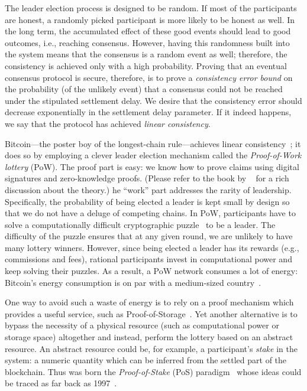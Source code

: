 The leader election process is designed to be random. 
If most of the participants are honest, 
a randomly picked participant is more likely to be honest as well. 
In the long term, the accumulated effect of these good events 
should lead to good outcomes, i.e., reaching consensus. 
However, having this randomness built into the system means 
that the consensus is a random event as well; 
therefore, the consistency is achieved only with a high probability. 
Proving that an eventual consensus protocol is secure, 
therefore, is to prove a 
\emph{consistency error bound} 
on the probability (of the unlikely event) that a consensus could not be reached 
under the stipulated settlement delay. 
We desire that the consistency error should decrease exponentially 
in the settlement delay parameter. 
If it indeed happens, 
we say that the protocol has achieved \emph{linear consistency}.

Bitcoin---the poster boy of the longest-chain rule---achieves 
linear consistency~\cite{Nakamoto2008,GKL,PSS}; it does so by employing a clever leader election mechanism 
called the \emph{Proof-of-Work lottery} (PoW). 
The proof part is easy: we know how to prove claims using 
digital signatures and zero-knowledge proofs. (Please 
refer to the book by ~\citet{GoldreichFoC} 
for a rich discussion about the theory.) 
he ``work'' part addresses the rarity of leadership. 
Specifically, 
the probability of being elected a leader is kept small by design 
so that we do not have a deluge of competing chains. 
In PoW, participants have to solve a computationally difficult 
cryptographic puzzle~\cite{Nakamoto2008,GKL,Ghost} 
to be a leader. 
The difficulty of the puzzle ensures that at any given round, 
we are unlikely to have many lottery winners. 
However, since being elected a leader has its rewards (e.g., commissions and fees), 
rational participants invest in computational power 
and keep solving their puzzles. 
As a result, a PoW network consumes a lot of energy: 
Bitcoin's energy consumption is 
on par with a medium-sized country~\cite{BitcoinEnergy}.

One way to avoid such a waste of energy 
is to rely on a proof mechanism which provides 
a useful service, such as Proof-of-Storage~\cite{ProofOfSpace,Spacemint}. 
Yet another alternative is to bypass the necessity of a physical resource 
(such as computational power or storage space)
altogether and instead, perform the lottery based on an abstract resource. 
An abstract resource could be, for example, 
a participant's \emph{stake} in the system: 
a numeric quantity which can be inferred 
from the settled part of the blockchain. 
Thus was born the \emph{Proof-of-Stake} (PoS) paradigm~\cite{Ouroboros,Sleepy,SnowWhite,Praos} 
whose ideas could be traced as far back as 1997~\cite{hashcash}.

